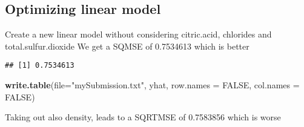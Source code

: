 \documentclass[
]{article}
\newenvironment{Shaded}{\begin{snugshade}}{\end{snugshade}}
\newcommand{\AttributeTok}[1]{\textcolor[rgb]{0.13,0.29,0.53}{#1}}
\newcommand{\ConstantTok}[1]{\textcolor[rgb]{0.56,0.35,0.01}{#1}}
\newcommand{\FunctionTok}[1]{\textcolor[rgb]{0.13,0.29,0.53}{\textbf{#1}}}
\newcommand{\NormalTok}[1]{#1}
\newcommand{\OtherTok}[1]{\textcolor[rgb]{0.56,0.35,0.01}{#1}}
\newcommand{\SpecialCharTok}[1]{\textcolor[rgb]{0.81,0.36,0.00}{\textbf{#1}}}
\newcommand{\StringTok}[1]{\textcolor[rgb]{0.31,0.60,0.02}{#1}}
\begin{document}
\hypertarget{optimizing-linear-model}{%
\subsection{Optimizing linear model}\label{optimizing-linear-model}}

Create a new linear model without considering citric.acid, chlorides and
total.sulfur.dioxide We get a SQMSE of 0.7534613 which is better

\begin{Shaded}
\end{Shaded}

\begin{verbatim}
## [1] 0.7534613
\end{verbatim}

\begin{Shaded}
\begin{Highlighting}[]
\FunctionTok{write.table}\NormalTok{(}\AttributeTok{file=}\StringTok{"mySubmission.txt"}\NormalTok{, yhat, }\AttributeTok{row.names =} \ConstantTok{FALSE}\NormalTok{, }\AttributeTok{col.names =} \ConstantTok{FALSE}\NormalTok{)}
\end{Highlighting}
\end{Shaded}

Taking out also density, leads to a SQRTMSE of 0.7583856 which is worse

\begin{Shaded}
\end{Shaded}
\end{document}
